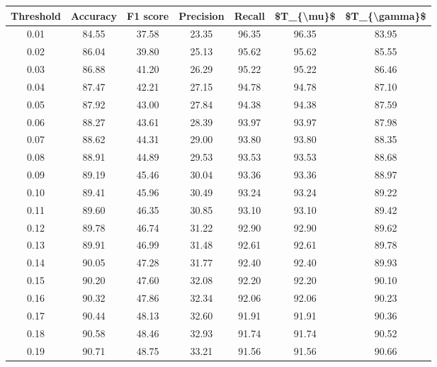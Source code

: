 \begin{tabular}{|c|c|c|c|c|c|c|}
\hline
 Threshold &  Accuracy &  F1 score &  Precision &  Recall &  \$T\_\{\textbackslash mu\}\$ &  \$T\_\{\textbackslash gamma\}\$ \\
\hline
      0.01 &     84.55 &     37.58 &      23.35 &   96.35 &      96.35 &         83.95 \\
      0.02 &     86.04 &     39.80 &      25.13 &   95.62 &      95.62 &         85.55 \\
      0.03 &     86.88 &     41.20 &      26.29 &   95.22 &      95.22 &         86.46 \\
      0.04 &     87.47 &     42.21 &      27.15 &   94.78 &      94.78 &         87.10 \\
      0.05 &     87.92 &     43.00 &      27.84 &   94.38 &      94.38 &         87.59 \\
      0.06 &     88.27 &     43.61 &      28.39 &   93.97 &      93.97 &         87.98 \\
      0.07 &     88.62 &     44.31 &      29.00 &   93.80 &      93.80 &         88.35 \\
      0.08 &     88.91 &     44.89 &      29.53 &   93.53 &      93.53 &         88.68 \\
      0.09 &     89.19 &     45.46 &      30.04 &   93.36 &      93.36 &         88.97 \\
      0.10 &     89.41 &     45.96 &      30.49 &   93.24 &      93.24 &         89.22 \\
      0.11 &     89.60 &     46.35 &      30.85 &   93.10 &      93.10 &         89.42 \\
      0.12 &     89.78 &     46.74 &      31.22 &   92.90 &      92.90 &         89.62 \\
      0.13 &     89.91 &     46.99 &      31.48 &   92.61 &      92.61 &         89.78 \\
      0.14 &     90.05 &     47.28 &      31.77 &   92.40 &      92.40 &         89.93 \\
      0.15 &     90.20 &     47.60 &      32.08 &   92.20 &      92.20 &         90.10 \\
      0.16 &     90.32 &     47.86 &      32.34 &   92.06 &      92.06 &         90.23 \\
      0.17 &     90.44 &     48.13 &      32.60 &   91.91 &      91.91 &         90.36 \\
      0.18 &     90.58 &     48.46 &      32.93 &   91.74 &      91.74 &         90.52 \\
      0.19 &     90.71 &     48.75 &      33.21 &   91.56 &      91.56 &         90.66 \\

\end{tabular}
